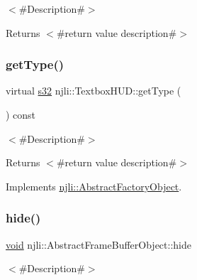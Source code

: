 $<$\#\+Description\#$>$

\begin{DoxyReturn}{Returns}
$<$\#return value description\#$>$ 
\end{DoxyReturn}
\mbox{\label{classnjli_1_1_textbox_h_u_d_a2772cd4442dd8c315ca383b598c22be9}} 
\subsubsection{\texorpdfstring{get\+Type()}{getType()}}
{\footnotesize\ttfamily virtual \mbox{\hyperlink{_util_8h_aa62c75d314a0d1f37f79c4b73b2292e2}{s32}} njli\+::\+Textbox\+H\+U\+D\+::get\+Type (\begin{DoxyParamCaption}{ }\end{DoxyParamCaption}) const\hspace{0.3cm}{\ttfamily [virtual]}}

$<$\#\+Description\#$>$

\begin{DoxyReturn}{Returns}
$<$\#return value description\#$>$ 
\end{DoxyReturn}


Implements \mbox{\hyperlink{classnjli_1_1_abstract_factory_object_a207c86146d40d0794708ae7f2d4e60a7}{njli\+::\+Abstract\+Factory\+Object}}.

\mbox{\label{classnjli_1_1_textbox_h_u_d_a5d7b8b3bc421084f282343e506a6d289}} 
\subsubsection{\texorpdfstring{hide()}{hide()}}
{\footnotesize\ttfamily \mbox{\hyperlink{_thread_8h_af1e856da2e658414cb2456cb6f7ebc66}{void}} njli\+::\+Abstract\+Frame\+Buffer\+Object\+::hide}

$<$\#\+Description\#$>$ \mbox{\label{classnjli_1_1_textbox_h_u_d_a3009efb11b4bcd56bd933c21b230a125}} 
